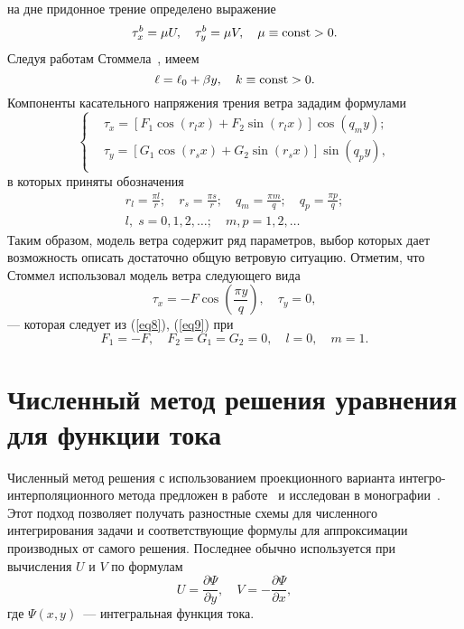 \documentclass[press]{vestnik}
\begin{document}
на дне придонное трение определено выражение
\begin{equation}
\label{eq6}
\tau_{x}^{b} =\mu U,\quad \tau_{y}^{b} =\mu V,\quad \mu \equiv \mathrm{const}>0.
\end{equation}
Следуя работам Стоммела~\cite{B09,B10,B11}, имеем
\begin{equation}
\label{eq7}
\ell =\ell_{0} +\beta y,\quad k\equiv \mathrm{const}>0.
\end{equation}
Компоненты касательного напряжения трения ветра зададим формулами
\begin{equation}
\label{eq8}
\left\{ {\begin{aligned}
 &\tau_{x} =\left[ {F_{1} \cos (r_{l} x)+F_{2} \sin (r_{l} x)} \right] \cos (q_{m} y); \\ 
 &\tau_{y} =\left[ {G_{1} \cos (r_{s} x)+G_{2} \sin (r_{s} x)} \right] \sin (q_{p} y), \\ 
 \end{aligned}} \right.
\end{equation}
в которых приняты обозначения
\begin{equation}\label{eq9}
\begin{gathered}
 r_{l} =\frac{\pi l}{r};\quad r_{s} =\frac{\pi s}{r};\quad q_{m} =\frac{\pi 
m}{q};\quad q_{p} =\frac{\pi p}{q}; \\ 
 l,\;s=0, 1, 2, \ldots;\quad m, p= 1, 2,\ldots
 \end{gathered}
\end{equation}
Таким образом, модель ветра содержит ряд параметров, выбор которых дает 
возможность описать достаточно общую ветровую ситуацию. Отметим, что Стоммел 
использовал модель ветра следующего вида%
\begin{equation}
\label{eq10}
\tau_{x} =-F \cos \left( {\frac{\pi y}{q}} \right),\quad \tau 
_{y} =0,
\end{equation}
--- которая следует из (\ref{eq8}), (\ref{eq9}) при 
\[
F_{1} =-F,\quad F_{2} =G_{1} =G_{2} =0,\quad l=0,\quad m=1.
\]

\section{Численный метод решения уравнения для функции тока}

Численный метод решения с использованием проекционного варианта 
интегро-интерполяционного метода предложен в работе~\cite{B12} и исследован в 
монографии~\cite{B13}. Этот подход позволяет получать разностные схемы для 
численного интегрирования задачи и соответствующие формулы для аппроксимации 
производных от самого решения. Последнее обычно используется  при вычисления 
$U$ и $V$ по формулам
\begin{equation}
\label{eq11}
U=\frac{\partial \Psi }{\partial y},\quad V=-\frac{\partial \Psi 
}{\partial x},
\end{equation}
где $\Psi \left( {x,y} \right)$~--- интегральная функция тока.
\end{document}
